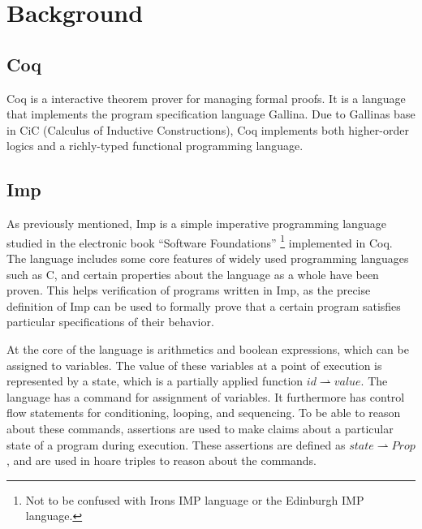 \section{Background}
\label{sec:background}
\subsection{Coq}
Coq is a interactive theorem prover for managing formal proofs. It is a language that implements the program specification language Gallina. Due to Gallinas base in CiC (Calculus of Inductive Constructions), Coq implements both higher-order logics and a richly-typed functional programming language.

\subsection{Imp}
\label{sec:background_imp}
As previously mentioned, Imp is a simple imperative programming language studied in the electronic book ``Software Foundations'' \footnote{Not to be confused with Irons IMP language or the Edinburgh IMP language.} implemented in Coq. The language includes some core features of widely used programming languages such as C, and certain properties about the language as a whole have been proven. This helps verification of programs written in Imp, as the precise definition of Imp can be used to formally prove that a certain program satisfies particular specifications of their behavior. 

At the core of the language is arithmetics and boolean expressions, which can be assigned to variables. The value of these variables at a point of execution is represented by a state, which is a partially applied function $id \rightharpoonup value$. The language has a command for assignment of variables. It furthermore has control flow statements for conditioning, looping, and sequencing. To be able to reason about these commands, assertions are used to make claims about a particular state of a program during execution. These assertions are defined as $state \rightharpoonup Prop$, and are used in hoare triples to reason about the commands.

